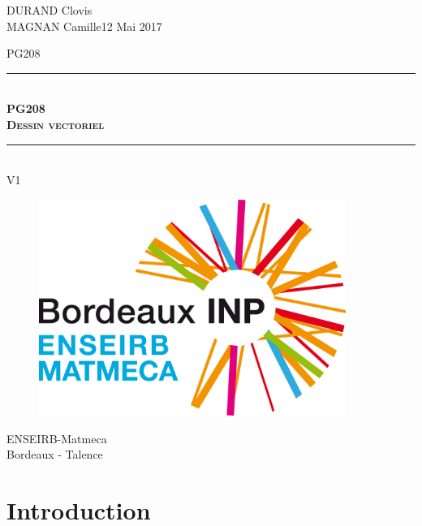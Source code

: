 \documentclass[11pt]{article}
\newcommand{\HRule}{\rule{\linewidth}{0.5mm}}
\begin{document}
\noindent 
DURAND Clovis \\ MAGNAN Camille\hfill{12 Mai 2017}



\vspace{2cm}
\begin{center}
    \Large{PG208} %
    \HRule \\[0.1cm]
    {\textsc{\LARGE \textbf{PG208 \\ Dessin vectoriel}}}\\
    \HRule\\[02cm]
    \Large{V1}
\end{center}
\vspace{1,5cm}

\begin{figure}[htbp]
    \begin{center}
        \includegraphics[width=10cm]{Logo-quadri.png}
    \end{center}
\end{figure}

\vspace{1cm}
\begin{center}
    \Large{ENSEIRB-Matmeca \\ Bordeaux - Talence}
\end{center}

\vspace{2cm}

\newpage
\tableofcontents
\listoffigures
\newpage 


\section{Introduction}
\end{document}
